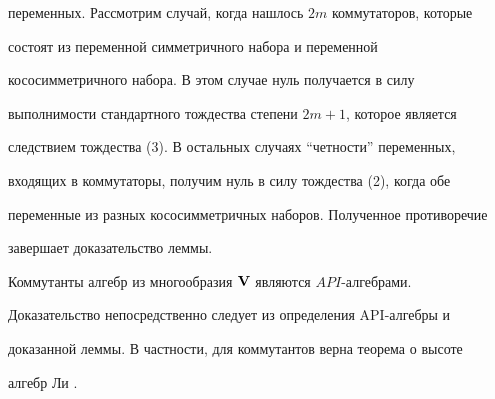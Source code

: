 \begin{pf}
переменных. Рассмотрим случай, когда нашлось $2m$ коммутаторов, которые


состоят из переменной симметричного набора и переменной


кососимметричного набора. В этом случае нуль получается в силу


выполнимости стандартного тождества степени $2m+1$, которое является


следствием тождества (3). В остальных случаях ``четности'' переменных,


входящих в коммутаторы, получим нуль в силу тождества (2), когда обе


переменные из разных кососимметричных наборов. Полученное противоречие


завершает доказательство леммы.


\end{pf}





\begin{cornonum}


Коммутанты алгебр из многообразия $\bold V$ являются $API$-алгебрами.


\end{cornonum}





Доказательство непосредственно следует из определения API-алгебры и


доказанной леммы. В частности, для коммутантов верна теорема о высоте


алгебр Ли \cite{8}.





